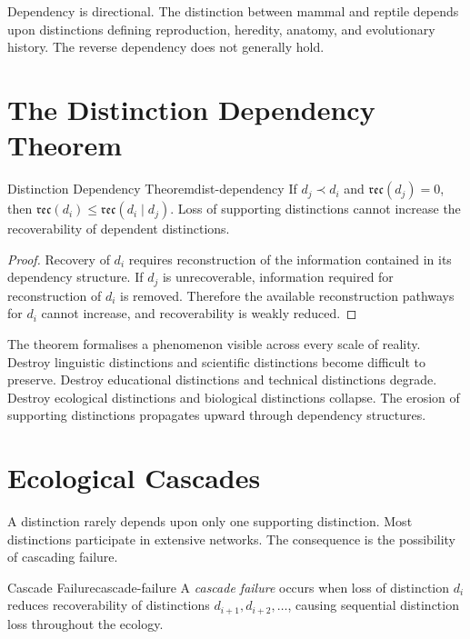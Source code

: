 \documentclass[12pt,twoside,openright]{book}
\newcommand{\reco}{\mathfrak{rec}}
\begin{document}
Dependency is directional. The distinction between mammal
and reptile depends upon distinctions defining
reproduction, heredity, anatomy, and evolutionary history.
The reverse dependency does not generally hold.

\section{The Distinction Dependency Theorem}
\label{sec:ch12-dependency-thm}

\begin{theorem}{Distinction Dependency Theorem}{dist-dependency}
  If $d_j \prec d_i$ and $\reco(d_j) = 0$, then
  $\reco(d_i) \le \reco(d_i \mid d_j)$. Loss of supporting
  distinctions cannot increase the recoverability of
  dependent distinctions.
\end{theorem}

\begin{proof}
  Recovery of $d_i$ requires reconstruction of the
  information contained in its dependency structure. If
  $d_j$ is unrecoverable, information required for
  reconstruction of $d_i$ is removed. Therefore the
  available reconstruction pathways for $d_i$ cannot
  increase, and recoverability is weakly reduced.
\end{proof}

The theorem formalises a phenomenon visible across every
scale of reality. Destroy linguistic distinctions and
scientific distinctions become difficult to preserve.
Destroy educational distinctions and technical distinctions
degrade. Destroy ecological distinctions and biological
distinctions collapse. The erosion of supporting
distinctions propagates upward through dependency
structures.

\section{Ecological Cascades}
\label{sec:ch12-cascades}

A distinction rarely depends upon only one supporting
distinction. Most distinctions participate in extensive
networks. The consequence is the possibility of cascading
failure.

\begin{definition}{Cascade Failure}{cascade-failure}
  A \emph{cascade failure} occurs when loss of distinction
  $d_i$ reduces recoverability of distinctions
  $d_{i+1},d_{i+2},\ldots$, causing sequential distinction
  loss throughout the ecology.
\end{definition}
\end{document}
